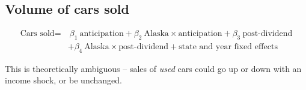 \documentclass[11pt,letterpaper,oneside]{article}
\newcommand{\gdp}{\textsc{gdp}}
\newcommand{\snippet}[1]{\hspace{-0.15em}}
\begin{document}
\begin{doublespacing}

%

\subsection{Volume of cars sold}
\begin{align}
    \label{eqn:cars_sold_with_anticipation}
    \text{Cars sold} = & \ \beta_1 \ \text{anticipation} + \beta_2 \ \text{Alaska} \times \text{anticipation} + \beta_3 \ \text{post-dividend} \\ \nonumber
    &+ \beta_4 \ \text{Alaska} \times \text{post-dividend} + \text{state and year fixed effects}
\end{align}


This is theoretically ambiguous -- sales of \emph{used} cars could go up or down with an income shock, or be unchanged.



\end{doublespacing}
\end{document}
